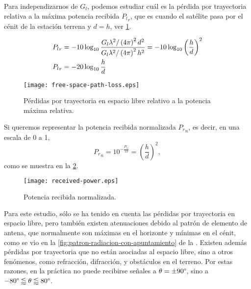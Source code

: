 \documentclass{article}
\newenvironment{standalone}{\begin{preview}}{\end{preview}}
\begin{document}
\begin{standalone}
  Para independizarnos de $G_l$, podemos estudiar cuál es la pérdida por trayectoria relativa a la máxima potencia recibida ${P_l}_r$, que es cuando el satélite pasa por el cénit de la estación terrena y $d = h$, ver \cref{fig:free-space-path-loss}.

  \begin{align}
    {P_l}_r &= -10 \log_{10}{ \frac{ G_l \lambda^2 / \left( 4\pi \right)^2 d^2 }{ G_l \lambda^2 / \left( 4\pi \right)^2 h^2 }} = - 10 \log_{10}{ \left( \frac{h}{d} \right)^2} \nonumber \\
    {P_l}_r &= -20 \log_{10}{\frac{h}{d}}
    \tagaddtext{[\si{\decibel}]}
  \end{align}

  \begin{figure}[!htbp]
    \centering
    \texttt{[image: free-space-path-loss.eps]}
    \caption{Pérdidas por trayectoria en espacio libre relativo a la potencia máxima relativa.}
    \label{fig:free-space-path-loss}
  \end{figure}

  Si queremos representar la potencia recibida normalizada ${P_r}_n$, es decir, en una escala de 0 a 1,
  \begin{equation}
    {P_r}_n = 10^{ - \frac{{P_l}_r}{10} } = \left( \frac{h}{d} \right)^2,
  \end{equation}
  como se muestra en la \cref{fig:received-power}.

  \begin{figure}[!htbp]
    \centering
    \texttt{[image: received-power.eps]}
    \caption{Potencia recibida normalizada.}
    \label{fig:received-power}
  \end{figure}

  Para este estudio, sólo se ha tenido en cuenta las pérdidas por trayectoria en espacio libre, pero también existen atenuaciones debido al patrón de elemento de antena, que normalmente son máximas en el horizonte y mínimas en el cénit, como se vio en la \cref{fig:patron-radiacion-con-apuntamiento} de la .
  Existen además pérdidas por trayectoria que no están asociadas al espacio libre, sino a otros fenómenos, como refracción, difracción, y obstáculos en el terreno.
  Por estas razones, en la práctica no puede recibirse señales a $\theta = \pm 90 \degree$, sino a $-80\degree \lessapprox \theta \lessapprox 80\degree$.



\end{standalone}
\end{document}
